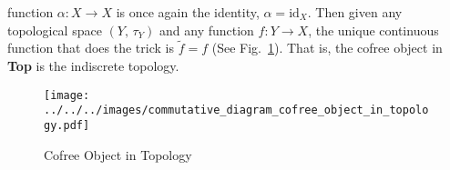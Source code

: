 \documentclass{article}
\theoremstyle{plain}
\theoremstyle{normal}
\begin{document}
            function $\alpha:X\rightarrow{X}$ is once again the identity,
            $\alpha=\textrm{id}_{X}$. Then given any topological space
            $(Y,\,\tau_{Y})$ and any function $f:Y\rightarrow{X}$, the
            unique continuous function that does the trick is
            $\tilde{f}=f$ (See
            Fig.~\ref{fig:commutative_diagram_cofree_object_in_topology}).
            That is, the cofree object in \textbf{Top} is the indiscrete
            topology.
            \begin{figure}
                \centering
                \texttt{[image: ../../../images/commutative\_diagram\_cofree\_object\_in\_topology.pdf]}
                \caption{Cofree Object in Topology}
                \label{fig:commutative_diagram_cofree_object_in_topology}
            \end{figure}
\end{document}
